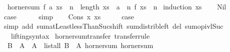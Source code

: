 \begin{isabellebody}
\ \ {\isacartoucheopen}horner{\isacharunderscore}{\kern0pt}sum\ f\ a\ xs\ {\isacharequal}{\kern0pt}\ {\isacharparenleft}{\kern0pt}{\isasymSum}n\ {\isacharequal}{\kern0pt}\ {}{\isachardot}{\kern0pt}{\isachardot}{\kern0pt}{\isacharless}{\kern0pt}length\ xs{\isachardot}{\kern0pt}\ {\isacharparenleft}{\kern0pt}{\isacharparenleft}{\kern0pt}{\isacharasterisk}{\kern0pt}{\isacharparenright}{\kern0pt}\ a\ {\isacharcircum}{\kern0pt}{\isacharcircum}{\kern0pt}\ n{\isacharparenright}{\kern0pt}\ {\isacharparenleft}{\kern0pt}f\ {\isacharparenleft}{\kern0pt}xs\ {\isacharbang}{\kern0pt}\ n{\isacharparenright}{\kern0pt}{\isacharparenright}{\kern0pt}{\isacharparenright}{\kern0pt}{\isacartoucheclose}\isanewline
%
\isadelimproof
%
\endisadelimproof
%
\isatagproof
{}\isamarkupfalse%
\ {\isacharparenleft}{\kern0pt}induction\ xs{\isacharparenright}{\kern0pt}\isanewline
\ \ \isamarkupfalse%
\ Nil\isanewline
\ \ \isamarkupfalse%
\ \isamarkupfalse%
\ {\isacharquery}{\kern0pt}case\isanewline
\ \ \ \ \isamarkupfalse%
\ simp\isanewline
{}\isamarkupfalse%
\isanewline
\ \ \isamarkupfalse%
\ {\isacharparenleft}{\kern0pt}Cons\ x\ xs{\isacharparenright}{\kern0pt}\isanewline
\ \ \isamarkupfalse%
\ \isamarkupfalse%
\ {\isacharquery}{\kern0pt}case\isanewline
\ \ \ \ \isamarkupfalse%
\ {\isacharparenleft}{\kern0pt}simp\ add{\isacharcolon}{\kern0pt}\ sum{\isachardot}{\kern0pt}atLeast{}{\isacharunderscore}{\kern0pt}lessThan{\isacharunderscore}{\kern0pt}Suc{\isacharunderscore}{\kern0pt}shift\ sum{\isacharunderscore}{\kern0pt}distrib{\isacharunderscore}{\kern0pt}left\ del{\isacharcolon}{\kern0pt}\ sum{\isachardot}{\kern0pt}op{\isacharunderscore}{\kern0pt}ivl{\isacharunderscore}{\kern0pt}Suc{\isacharparenright}{\kern0pt}\isanewline
{}\isamarkupfalse%
%
\endisatagproof
{\isafoldproof}%
%
\isadelimproof
\isanewline
%
\endisadelimproof
\isanewline
{}\isamarkupfalse%
\isanewline
\isanewline
{}\isamarkupfalse%
\isanewline
\ \ \ lifting{\isacharunderscore}{\kern0pt}syntax\isanewline
{}\isanewline
\isanewline
{}\isamarkupfalse%
\ horner{\isacharunderscore}{\kern0pt}sum{\isacharunderscore}{\kern0pt}transfer\ {\isacharbrackleft}{\kern0pt}transfer{\isacharunderscore}{\kern0pt}rule{\isacharbrackright}{\kern0pt}{\isacharcolon}{\kern0pt}\isanewline
\ \ {\isacartoucheopen}{\isacharparenleft}{\kern0pt}{\isacharparenleft}{\kern0pt}B\ {\isacharequal}{\kern0pt}{\isacharequal}{\kern0pt}{\isacharequal}{\kern0pt}{\isachargreater}{\kern0pt}\ A{\isacharparenright}{\kern0pt}\ {\isacharequal}{\kern0pt}{\isacharequal}{\kern0pt}{\isacharequal}{\kern0pt}{\isachargreater}{\kern0pt}\ A\ {\isacharequal}{\kern0pt}{\isacharequal}{\kern0pt}{\isacharequal}{\kern0pt}{\isachargreater}{\kern0pt}\ list{\isacharunderscore}{\kern0pt}all{}\ B\ {\isacharequal}{\kern0pt}{\isacharequal}{\kern0pt}{\isacharequal}{\kern0pt}{\isachargreater}{\kern0pt}\ A{\isacharparenright}{\kern0pt}\ horner{\isacharunderscore}{\kern0pt}sum\ horner{\isacharunderscore}{\kern0pt}sum{\isacartoucheclose}\isanewline

\end{isabellebody}
